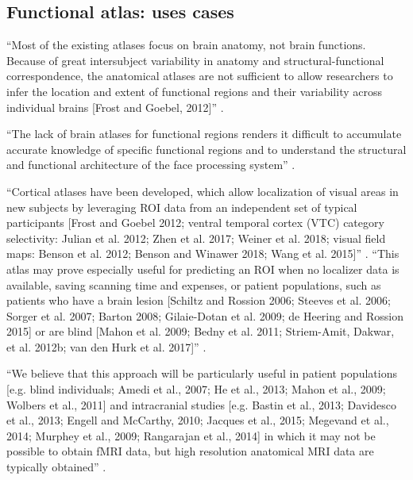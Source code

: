 

\subsection{Functional atlas: uses cases}


``Most of the existing atlases focus on brain anatomy, not brain functions.
%
Because of great intersubject variability in anatomy and structural-functional
correspondence, the anatomical atlases are not sufficient to allow researchers
to infer the location and extent of functional regions and their variability
across individual brains [Frost and Goebel, 2012]'' \citep{zhen2015quantifying}.

``The lack of brain atlases for functional regions renders it difficult to
accumulate accurate knowledge of specific functional regions and to understand
the structural and functional architecture of the face processing system''
\citep{zhen2015quantifying}.


``Cortical atlases have been developed, which allow localization of visual areas
in new subjects by leveraging ROI data from an independent set of typical
participants [Frost and Goebel 2012; ventral temporal cortex (VTC) category
selectivity: Julian et al. 2012; Zhen et al.  2017; Weiner et al. 2018; visual
field maps: Benson et al. 2012; Benson and Winawer 2018; Wang et al. 2015]''
\citep{rosenke2021probabilistic}.
%
``This atlas may prove especially useful for predicting an ROI when no localizer
data is available, saving scanning time and expenses, or
%
patient populations, such as patients who have a brain lesion [Schiltz and
Rossion 2006; Steeves et al. 2006; Sorger et al. 2007; Barton 2008; Gilaie-Dotan
et al. 2009; de Heering and Rossion 2015] or are blind [Mahon et al. 2009; Bedny
et al. 2011; Striem-Amit, Dakwar, et al.  2012b; van den Hurk et al. 2017]''
\citep{rosenke2021probabilistic}.

``We believe that this approach will be particularly useful in patient
populations [e.g. blind individuals; Amedi et al., 2007; He et al., 2013; Mahon
et al., 2009; Wolbers et al., 2011] and intracranial studies [e.g. Bastin et
al., 2013; Davidesco et al., 2013; Engell and McCarthy, 2010; Jacques et al.,
2015; Megevand et al., 2014; Murphey et al., 2009; Rangarajan et al., 2014] in
which it may not be possible to obtain fMRI data, but high resolution anatomical
MRI data are typically obtained'' \citep{weiner2018defining}.


